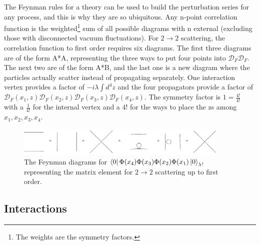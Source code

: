The Feynman rules for a theory can be used to build the perturbation series for any process, and this is why they are so ubiquitous. Any n-point correlation function is the weighted\footnote{The weights are the symmetry factors.} sum of all possible diagrams with n external (excluding those with disconnected vacuum fluctuations). For $2 \rightarrow 2$ scattering, the correlation function to first order requires six diagrams. The first three diagrams are of the form A*A, representing the three ways to put four points into $\mathcal{D}_F\mathcal{D}_F$. The next two are of the form A*B, and the last one is a new diagram where the particles actually scatter instead of propagating separately. One interaction vertex provides a factor of $-i\lambda\int d^4z$ and the four propagators provide a factor of $\mathcal{D}_F(x_1,z)\mathcal{D}_F(x_2,z)\mathcal{D}_F(x_3,z)\mathcal{D}_F(x_4,z)$. The symmetry factor is $1 = \frac{4!}{4!}$ with a $\frac{1}{4!}$ for the internal vertex and a 4! for the ways to place the zs among $x_1, x_2, x_3, x_4$.

\begin{figure}[h!]
  \centering
  \includegraphics[width=4in]{images/phi4_2-2_scattering.pdf}
  \caption
   {The Feynman diagrams for $\bra{0}\Phi(x_4)\Phi(x_3)\Phi(x_2)\Phi(x_1)\ket{0}_{\lambda^1}$ representing the matrix element for $2\rightarrow 2$ scattering up to first order.}
  \label{fig:feyn2-2}
\end{figure}

\subsection{Interactions}

